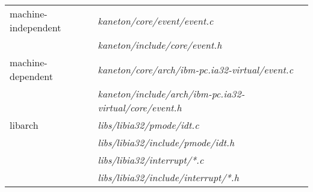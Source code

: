\begin{itemize}
    \begin{tabular}{| l | l |}
      \hline
      machine-independent & {\em kaneton/core/event/event.c}\\
      &  {\em kaneton/include/core/event.h}\\\hline
      machine-dependent & {\em kaneton/core/arch/ibm-pc.ia32-virtual/event.c}\\
      & {\em kaneton/include/arch/ibm-pc.ia32-virtual/core/event.h}\\\hline
      libarch & {\em libs/libia32/pmode/idt.c}\\
      & {\em libs/libia32/include/pmode/idt.h}\\
      & {\em libs/libia32/interrupt/*.c}\\
      & {\em libs/libia32/include/interrupt/*.h}\\\hline
    \end{tabular}
\end{itemize}


%
%

\newpage

